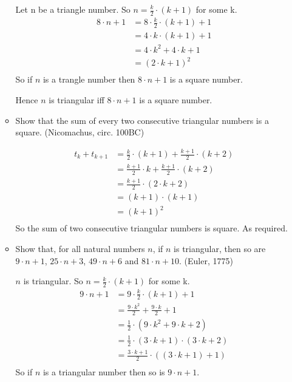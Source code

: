 \documentclass[10pt,\jkfside,a4paper]{article}
\begin{document}
\begin{enumerate}
\begin{itemize}
Let n be a triangle number. So $n = \frac{k}{2}\cdot(k + 1)$ for some k.
\begin{equation}
\begin{split}
8\cdot n + 1 &= 8\cdot \frac{k}{2}\cdot(k + 1) + 1\\
			 &= 4\cdot k\cdot (k + 1) + 1\\
			 &= 4\cdot k^2 + 4\cdot k + 1\\
			 &= (2\cdot k + 1)^2\\
\end{split}
\end{equation}
So if $n$ is a trangle number then $8\cdot n + 1$ is a square number.

Hence $n$ is triangular iff $8\cdot n + 1$ is a square number.

\item Show that the sum of every two consecutive triangular numbers is a square. (Nicomachus, circ. 100BC)

\begin{equation}
\begin{split}
t_k + t_{k + 1} &= \frac{k}{2}\cdot (k + 1) + \frac{k + 1}{2}\cdot(k + 2)\\
				&= \frac{k + 1}{2}\cdot k + \frac{k + 1}{2}\cdot(k + 2)\\
				&= \frac{k + 1}{2}\cdot(2\cdot k + 2)\\
				&= (k + 1)\cdot (k + 1)\\
				&= (k + 1)^2\\
\end{split}
\end{equation}
So the sum of two consecutive triangular numbers is square. As required.

\item Show that, for all natural numbers $n$, if $n$ is triangular, then so are $9\cdot n + 1$, $25\cdot n + 3$, 
$49\cdot n + 6$ and $81\cdot n + 10$. (Euler, 1775)

$n$ is triangular. So $n = \frac{k}{2}\cdot(k + 1)$ for some k.
\begin{equation}
\begin{split}
9\cdot n + 1 &= 9\cdot \frac{k}{2}\cdot(k + 1) + 1\\
			 &=	\frac{9\cdot k^2}{2} + \frac{9\cdot k}{2} + 1\\
			 &= \frac{1}{2}\cdot (9\cdot k^2 + 9\cdot k + 2)\\
			 &=	\frac{1}{2}\cdot (3\cdot k + 1)\cdot (3\cdot k + 2)\\
			 &= \frac{3\cdot k + 1}{2}\cdot ((3\cdot k + 1) + 1)\\
\end{split}
\end{equation}
So if $n$ is a triangular number then so is $9\cdot n + 1$.


\end{itemize}
\end{enumerate}
\end{document}
